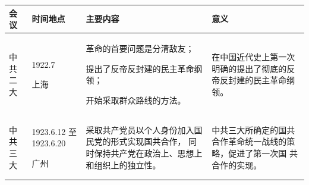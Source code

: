 \documentclass[10pt, UTF8]{book} %
\begin{document}
\begin{mdframed}[frametitle={中国共产党的重要会议}]
    { %
    \small
    \label{中国共产党重要会议汇总} %
    \begin{longtable}{p{7em}p{5em}p{15.5em}p{15.5em}}
        \hline
        \textbf{会议} & \textbf{时间地点} & \textbf{主要内容} & \textbf{意义} \\
        \hline
        \endhead
        \hline
        \endfoot
    
        中共二大 & 1922.7 
        
        上海
        & 革命的首要问题是分清敌友；

        提出了反帝反封建的民主革命纲领；
        
        开始采取群众路线的方法。
        & 在中国近代史上第一次明确的提出了彻底的反帝反封建的民主革命纲领。\\
        \hline
        中共三大
        & 1923.6.12 
        \newline 至 1923.6.20

        广州
        & 采取共产党员以个人身份加入国民党的形式实现国共合作，
        同时保持共产党在政治上、思想上和组织上的独立性。
        & 中共三大所确定的国共合作革命统一战线的策略，促进了第一次国
        共合作的实现。 \\ 
        \hline
    \end{longtable}}
\end{mdframed}





\end{document}
